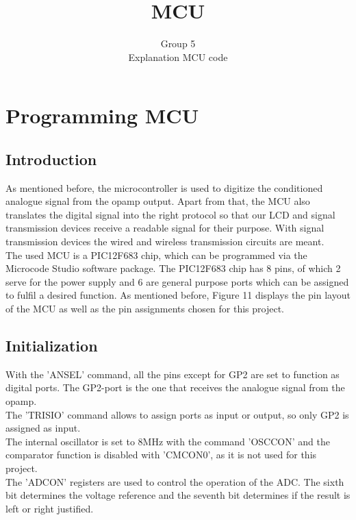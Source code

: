 \documentclass[12pt]{article}
\begin{document}
 
 
\title{ MCU }
\author{Group 5\\ %
Explanation MCU code}
\section{Programming MCU}
\subsection{Introduction}
As mentioned before, the microcontroller is used to digitize the conditioned analogue signal from the opamp output. Apart from that, the MCU also translates the digital signal into the right protocol so that our LCD and signal transmission devices receive a readable signal for their purpose. With signal transmission devices the wired and wireless transmission circuits are meant.\\

\noindent The used MCU is a PIC12F683 chip, which can be programmed via the Microcode Studio software package. The PIC12F683 chip has 8 pins, of which 2 serve for the power supply and 6 are general purpose ports which can be assigned to fulfil a desired function. As mentioned before, Figure 11 displays the pin layout of the MCU as well as the pin assignments chosen for this project.

\subsection{Initialization}

With the ’ANSEL’ command, all the pins except for GP2 are set to function as digital ports. The GP2-port is the one that receives the analogue signal from the opamp. \\

\noindent The ’TRISIO’ command allows to assign ports as input or output, so only GP2 is assigned as input. \\

\noindent The internal oscillator is set to 8MHz with the command ’OSCCON’ and the comparator function is disabled with ’CMCON0’, as it is not used for this project.\\

\noindent The ’ADCON’ registers are used to control the operation of the ADC. The sixth bit determines the voltage reference and the seventh bit determines if the result is left or right justified.\\
\end{document}
